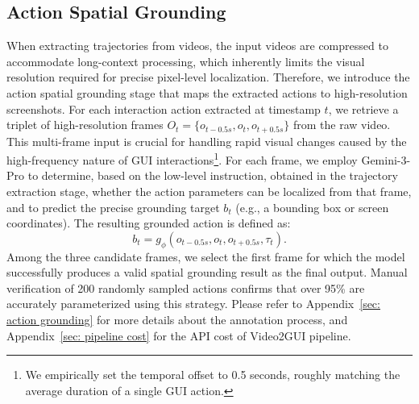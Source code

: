 \documentclass{article}
\theoremstyle{plain}
\theoremstyle{definition}
\theoremstyle{remark}
\begin{document}

\subsection{Action Spatial Grounding}
\label{subsec: spatial grounding}
When extracting trajectories from videos, the input videos are compressed to accommodate long-context processing, which inherently limits the visual resolution required for precise pixel-level localization. Therefore, we introduce the action spatial grounding stage that maps the extracted actions to high-resolution screenshots.
For each interaction action extracted at timestamp $t$, we retrieve a triplet of high-resolution frames $O_t = \{o_{t-0.5s}, o_t, o_{t+0.5s}\}$ from the raw video. This multi-frame input is crucial for handling rapid visual changes caused by the high-frequency nature of GUI interactions\footnote{We empirically set the temporal offset to 0.5 seconds, roughly matching the average duration of a single GUI action.}. For each frame, we employ Gemini-3-Pro to determine, based on the low-level instruction, obtained in the trajectory extraction stage, whether the action parameters can be localized from that frame, and to predict the precise grounding target $b_t$ (e.g., a bounding box or screen coordinates). The resulting grounded action is defined as: 
\begin{equation}
b_t = g_\phi(o_{t-0.5s}, o_t, o_{t+0.5s}, \tau_t).
\end{equation}
Among the three candidate frames, we select the first frame for which the model successfully produces a valid spatial grounding result as the final output. 
Manual verification of 200 randomly sampled actions confirms that over 95\% are accurately parameterized using this strategy.
Please refer to Appendix~\ref{sec: action grounding} for more details about the annotation process, and Appendix~\ref{sec: pipeline cost} for the API cost of Video2GUI pipeline.
\end{document}
